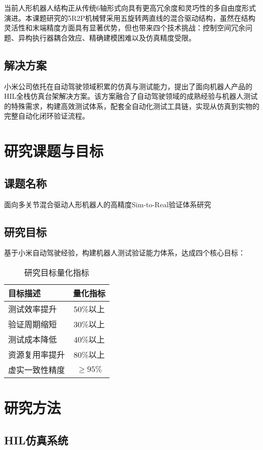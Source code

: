 \documentclass[12pt]{article}
\begin{document}
当前人形机器人结构正从传统6轴形式向具有更高冗余度和灵巧性的多自由度形式演进。本课题研究的5R2P机械臂采用五旋转两直线的混合驱动结构，虽然在结构灵活性和末端精度方面具有显著优势，但也带来四个技术挑战：控制空间冗余问题、异构执行器耦合效应、精确建模困难以及仿真精度受限。

\subsection{解决方案}

小米公司依托在自动驾驶领域积累的仿真与测试能力，提出了面向机器人产品的HIL全栈仿真台架解决方案。该方案融合了自动驾驶领域的成熟经验与机器人测试的特殊需求，构建高效测试体系，配套全自动化测试工具链，实现从仿真到实物的完整自动化闭环验证流程。

\section{研究课题与目标}
\subsection{课题名称}

面向多关节混合驱动人形机器人的高精度Sim-to-Real验证体系研究

\subsection{研究目标}

基于小米自动驾驶经验，构建机器人测试验证能力体系，达成四个核心目标：

\begin{table}[H]
\centering
\caption{研究目标量化指标}
\begin{tabular}{p{7cm}c}
\toprule
\textbf{目标描述} & \textbf{量化指标} \\
\midrule
测试效率提升 & 50\%以上 \\
验证周期缩短 & 30\%以上 \\
测试成本降低 & 40\%以上 \\
资源复用率提升 & 80\%以上 \\
虚实一致性精度 & $\geqslant 95\%$ \\
\bottomrule
\end{tabular}
\end{table}

\section{研究方法}
\subsection{HIL仿真系统}
\end{document}
